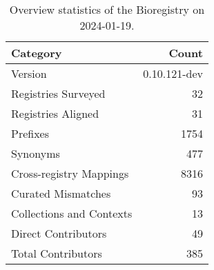 \begin{table}
\caption{Overview statistics of the Bioregistry on 2024-01-19.}
\label{tab:bioregistry-summary}
\begin{tabular}{lr}
\toprule
Category & Count \\
\midrule
Version & 0.10.121-dev \\
Registries Surveyed & 32 \\
Registries Aligned & 31 \\
Prefixes & 1754 \\
Synonyms & 477 \\
Cross-registry Mappings & 8316 \\
Curated Mismatches & 93 \\
Collections and Contexts & 13 \\
Direct Contributors & 49 \\
Total Contributors & 385 \\
\bottomrule
\end{tabular}
\end{table}
